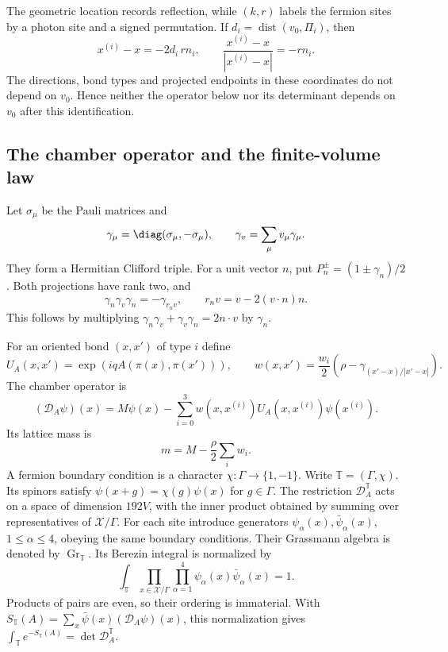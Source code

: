 The geometric location records reflection, while $(k,r)$ labels the
fermion sites by a photon site and a signed permutation. If
$d_i=\operatorname{dist}(v_0,\Pi_i)$, then
\[
 x^{(i)}-x=-2d_i\,rn_i,
 \qquad \frac{x^{(i)}-x}{|x^{(i)}-x|}=-rn_i.
\]
The directions, bond types and projected endpoints in these
coordinates do not depend on $v_0$. Hence neither the operator below
nor its determinant depends on $v_0$ after this identification.
\subsection{The chamber operator and the finite-volume law}
\label{subsec:reg-law}

Let $\sigma_\mu$ be the Pauli matrices and
\[
 \gamma_\mu=\diag(\sigma_\mu,-\sigma_\mu),\qquad
 \gamma_v=\sum_\mu v_\mu\gamma_\mu.
\]
They form a Hermitian Clifford triple. For a unit vector $n$, put
$P_n^\pm=(1\pm\gamma_n)/2$. Both projections have rank two, and
\begin{equation}\label{eq:reg-clifford-reflection}
 \gamma_n\gamma_v\gamma_n=-\gamma_{r_nv},\qquad
 r_nv=v-2(v\cdot n)n.
\end{equation}
This follows by multiplying
$\gamma_n\gamma_v+\gamma_v\gamma_n=2n\cdot v$ by $\gamma_n$.

For an oriented bond $(x,x')$ of type $i$ define
\begin{equation}\label{eq:reg-hop}
 U_A(x,x')=\exp(iqA(\pi(x),\pi(x'))),\qquad
 w(x,x')=\frac{w_i}{2}\left(\rho-\gamma_{(x'-x)/|x'-x|}\right).
\end{equation}
The chamber operator is
\begin{equation}\label{eq:reg-dirac}
 (\mathcal D_A\psi)(x)=M\psi(x)-\sum_{i=0}^3
                   w(x,x^{(i)})U_A(x,x^{(i)})\psi(x^{(i)}).
\end{equation}
Its lattice mass is
\begin{equation}\label{eq:reg-lattice-mass}
 m=M-\frac\rho2\sum_iw_i.
\end{equation}
A fermion boundary condition is a character
$\chi:\Gamma\to\{1,-1\}$. Write $\mathbb T=(\Gamma,\chi)$.
Its spinors satisfy $\psi(x+g)=\chi(g)\psi(x)$ for $g\in\Gamma$.
The restriction $\mathcal D_A^{\mathbb T}$ acts on a space of dimension $192V$,
with the inner product obtained by summing over representatives of
$\mathcal X/\Gamma$. For each site introduce generators
$\psi_\alpha(x),\bar\psi_\alpha(x)$, $1\le\alpha\le4$, obeying the same
boundary conditions. Their Grassmann algebra is denoted by
$\operatorname{Gr}_{\mathbb T}$. Its Berezin integral is normalized by
\begin{equation}\label{eq:reg-berezin}
 \int_{\mathbb T}\prod_{x\in\mathcal X/\Gamma}
                  \prod_{\alpha=1}^4\psi_\alpha(x)\bar\psi_\alpha(x)=1.
\end{equation}
Products of pairs are even, so their ordering is immaterial. With
$S_{\mathbb T}(A)=\sum_x\bar\psi(x)(\mathcal D_A\psi)(x)$, this normalization
gives $\int_{\mathbb T}e^{-S_{\mathbb T}(A)}=\det \mathcal D_A^{\mathbb T}$.

